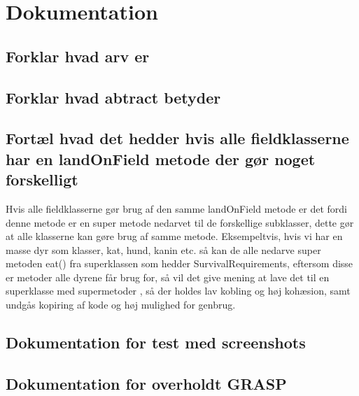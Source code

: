 \section{Dokumentation}
\subsection{Forklar hvad arv er}
\subsection{Forklar hvad abtract betyder}
\subsection{Fortæl hvad det hedder hvis alle fieldklasserne har en landOnField metode der gør noget forskelligt}
Hvis alle fieldklasserne gør brug af den samme landOnField metode er det fordi denne metode er en super metode nedarvet til de forskellige subklasser,
dette gør at alle klasserne kan gøre brug af samme metode. Eksempeltvis, hvis vi har en masse dyr som klasser, kat, hund, kanin etc. så kan de alle nedarve super metoden eat() fra 
superklassen som hedder SurvivalRequirements, eftersom disse er metoder alle dyrene får brug for, så vil det give mening at lave det til en superklasse med supermetoder
, så der holdes lav kobling og høj kohæsion, samt undgås kopiring af kode og høj mulighed for genbrug.
\subsection{Dokumentation for test med screenshots}
\subsection{Dokumentation for overholdt GRASP}